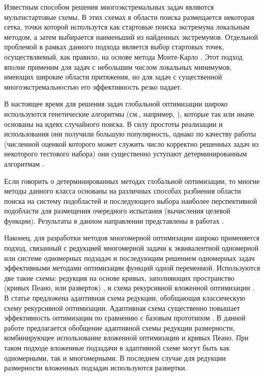 \documentclass[runningheads]{llncs}
\begin{document}
\Russian
Известным способом решения многоэкстремальных задач являются мультистартовые схемы. В этих схемах в области поиска размещается некоторая сетка, точки которой использутся как стартовые поиска экстремума локальным методом, а затем выбирается наименьший из найденных экстремумов. Отдельной проблемой в рамках данного подхода является выбор стартовых точек, осуществляемый, как правило, на основе метода Монте-Карло \cite{Zhigljavsky2008}. Этот подход вполне применим для задач с небольшим числом локальных минимумов, имеющих широкие области притяжения, но для задач с существенной многоэкстремальностью его эффективность резко падает. 

В настоящее время для решения задач глобальной оптимизации широко используются генетические алгоритмы (см., например, \cite{Yang2013}), которые так или иначе основаны на идеях случайного поиска. В силу простоты реализации и использования они получили большую популярность, однако по качеству работы (численной оценкой которого может служить число корректно решенных задач из некоторого тестового набора) они существенно уступают детерминированным алгоритмам \cite{Kvasov2018,Sergeyev2018}.

Если говорить о детерминированных методах глобальной оптимизации, то многие методы данного класса основаны на различных способах разбиения области поиска на систему подобластей и последующего выбора наиболее перспективной подобласти для размещения очередного испытания (вычисления целевой функции). Результаты в данном направлении представлены в работах \cite{Zilinskas2010,Paulavicius2016,Evtushenko2013,Jones2009,Sergeyev2015}.

Наконец, для разработки методов многомерной оптимизации широко применяется подход, связанный с редукцией многомерной задачи к эквивалентной одномерной или системе одномерных подзадач и последующим решением одномерных задач эффективными методами оптимизации функций одной переменной. Используются две такие схемы: редукция на основе кривых, заполняющих пространство (кривых Пеано, или разверток) \cite{Strongin2000,Sergeyev2013}, и схема рекурсивной вложенной оптимизации \cite{Strongin2000,Grishagin2001}. В статье \cite{Grishagin2016} предложена адаптивная схема редукции, обобщающая классическую схему рекурсивной оптимизации. Адаптивная схема существенно повышает эффективность оптимизации по сравнению с базовым прототипом \cite{Grishagin2016_1}. В данной работе предлагается обобщение адаптивной схемы редукции размерности, комбинирующее использование вложенной оптимизации и кривых Пеано. При таком подходе вложенные подзадачи в адаптивной схеме могут быть как одномерными, так и многомерными. В последнем случае для редукции размерности вложенных подзадач используются развертки.
\end{document}
